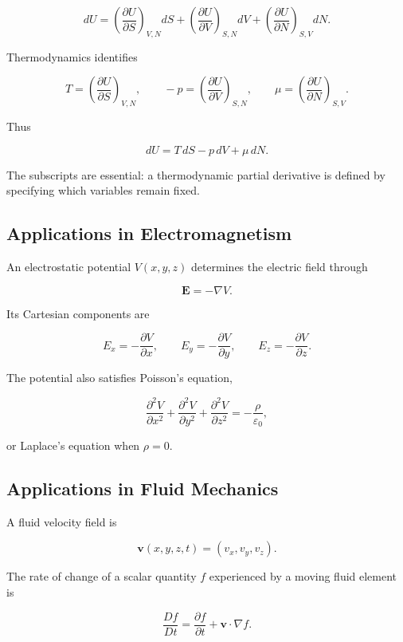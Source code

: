 \begin{equation}
\boxed{
dU
=
\left(\frac{\partial U}{\partial S}\right)_{V,N}dS
+
\left(\frac{\partial U}{\partial V}\right)_{S,N}dV
+
\left(\frac{\partial U}{\partial N}\right)_{S,V}dN.
}
\end{equation}

Thermodynamics identifies

\[
T=\left(\frac{\partial U}{\partial S}\right)_{V,N},
\qquad
-p=\left(\frac{\partial U}{\partial V}\right)_{S,N},
\qquad
\mu=\left(\frac{\partial U}{\partial N}\right)_{S,V}.
\]

Thus

\[
\boxed{dU=T\,dS-p\,dV+\mu\,dN.}
\]

The subscripts are essential: a thermodynamic partial derivative is defined by specifying which variables remain fixed.

\subsection{Applications in Electromagnetism}

An electrostatic potential $V(x,y,z)$ determines the electric field through

\[
\mathbf E=-\nabla V.
\]

Its Cartesian components are

\[
E_x=-\frac{\partial V}{\partial x},
\qquad
E_y=-\frac{\partial V}{\partial y},
\qquad
E_z=-\frac{\partial V}{\partial z}.
\]

The potential also satisfies Poisson's equation,

\[
\frac{\partial^2V}{\partial x^2}
+
\frac{\partial^2V}{\partial y^2}
+
\frac{\partial^2V}{\partial z^2}
=-\frac{\rho}{\varepsilon_0},
\]

or Laplace's equation when $\rho=0$.

\subsection{Applications in Fluid Mechanics}

A fluid velocity field is

\[
\mathbf v(x,y,z,t)
=
(v_x,v_y,v_z).
\]

The rate of change of a scalar quantity $f$ experienced by a moving fluid element is

\begin{equation}
\boxed{
\frac{Df}{Dt}
=
\frac{\partial f}{\partial t}
+
\mathbf v\cdot\nabla f.
}
\label{eq:material-derivative}
\end{equation}

